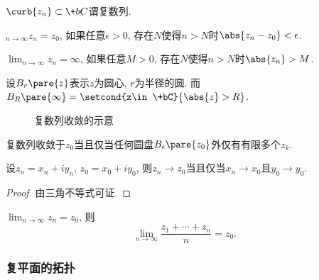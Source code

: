 \documentclass[../ComplexVariable.tex]{subfiles}
\begin{document}
\begin{definition}[复数列]
    $\curb{z_n}\subset \+bC$谓复数列.
\end{definition}
\begin{definition}[复数列的收敛]
    $\displaystyle_{n\rightarrow\infty} z_n = z_0$, 如果任意$\epsilon>0$, 存在$N$使得$n>N$时$\abs{z_n - z_0} < \epsilon$.
    \par
    $\displaystyle\lim_{n\rightarrow\infty} z_n = \infty$, 如果任意$M>0$, 存在$N$使得$n>N$时$\abs{z_n} > M$.
\end{definition}
设$B_r\pare{z}$表示$z$为圆心, $r$为半径的圆. 而$B_R\pare{\infty} = \setcond{z\in\+bC}{\abs{z}>R}$.
\begin{figure}[ht]
    \centering
    \caption{复数列收敛的示意}
\end{figure}
\begin{lemma}
    复数列收敛于$z_0$当且仅当任何圆盘$B_\epsilon\pare{z_0}$外仅有有限多个$z_k$.
\end{lemma}
\begin{theorem}
    设$z_n = x_n + iy_n$, $z_0 = x_0+iy_0$, 则$z_n\rightarrow z_0$当且仅当$x_n\rightarrow x_0$且$y_0\rightarrow y_0$.
\end{theorem}
\begin{proof}
    由三角不等式可证.
\end{proof}
\begin{sample}
    \begin{ex}
        $\displaystyle \lim_{n\rightarrow\infty} z_n = z_0$, 则
        \[ \lim_{n\rightarrow\infty} \frac{z_1 + \cdots + z_n}{n} = z_0. \]
    \end{ex}
\end{sample}


\subsubsection{复平面的拓扑} %
\label{ssub:复平面的拓扑}
\end{document}
